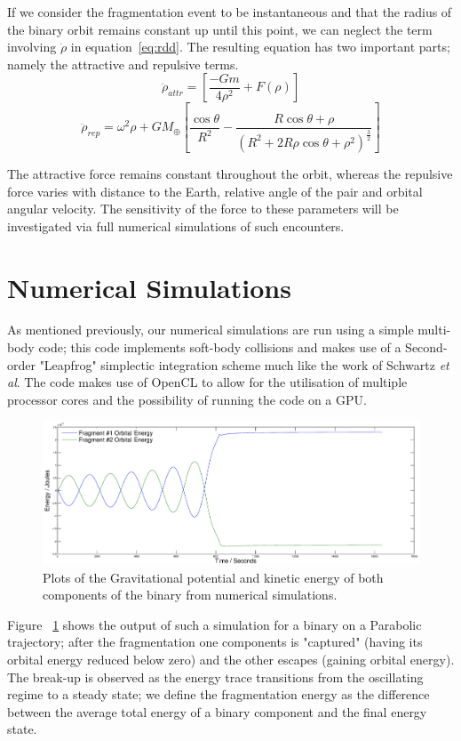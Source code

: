 \documentclass[letterpaper, preprint, paper,11pt]{AAS}	%
\begin{document}
If we consider the fragmentation event to be instantaneous and that the radius of the binary orbit remains constant up until this point, we can neglect the term involving $\dot{\rho}$ in equation~\ref{eq:rdd}. The resulting equation has two important parts; namely the attractive and repulsive terms.
\begin{equation} \label{eq:attr}
\ddot{\rho}_{attr} = \left[\frac{-Gm}{4\rho^{2}}+F(\rho)\right]
\end{equation}
\begin{equation} \label{eq:rep}
\ddot{\rho}_{rep} = \omega^{2}\rho+{GM_\oplus}\left[\frac{\cos\theta}{R^{2}}-\frac{R\cos\theta+\rho}{(R^{2}+2R\rho\cos\theta+\rho^{2})^\frac{3}{2}}\right]
\end{equation}

The attractive force remains constant throughout the orbit, whereas the repulsive force varies with distance to the Earth, relative angle of the pair and orbital angular velocity. The sensitivity of the force to these parameters will be investigated via full numerical simulations of such encounters. 


\section{Numerical Simulations}

As mentioned previously, our numerical simulations are run using a simple multi-body code; this code implements soft-body collisions and makes use of a Second-order "Leapfrog" simplectic integration scheme much like the work of Schwartz \textit{et al}\cite{soft}. The code makes use of OpenCL to allow for the utilisation of multiple processor cores and the possibility of running the code on a GPU.


\begin{figure}[H]
\centering
\centerline{\includegraphics[width=1.2\textwidth]{binary_num.eps}} 
\caption{Plots of the Gravitational potential and kinetic energy of both components of the binary from numerical simulations.} 
\label{fig:Num}
\end{figure}
 Figure ~\ref{fig:Num} shows the output of such a simulation for a binary on a Parabolic trajectory; after the fragmentation one components is "captured" (having its orbital energy reduced below zero) and the other escapes (gaining orbital energy). The break-up is observed as the energy trace transitions from the oscillating regime to a steady state; we define the fragmentation energy as the difference between the average total energy of a binary component and the final energy state.  
\end{document}
